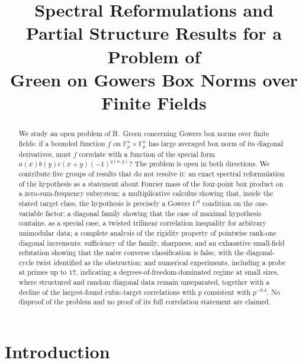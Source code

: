 \documentclass[11pt]{article}
\title{Spectral Reformulations and Partial Structure Results for a Problem of\\ Green on Gowers Box Norms over Finite Fields}
\author{}
\date{}
\theoremstyle{remark}
\begin{document}
\maketitle
\vspace{-2em}

\begin{abstract}
We study an open problem of B.~Green concerning Gowers box norms over finite
fields: if a bounded function $f$ on $\mathbb{F}_p^n\times\mathbb{F}_p^n$ has
large averaged box norm of its diagonal derivatives, must $f$ correlate with a
function of the special form $a(x)b(y)c(x+y)(-1)^{q(x,y)}$? The problem is
open in both directions. We contribute five groups of results that do not
resolve it: an exact spectral reformulation of the hypothesis as a statement
about Fourier mass of the four-point box product on a zero-sum-frequency
subsystem; a multiplicative calculus showing that, inside the stated target
class, the hypothesis is precisely a Gowers $U^3$ condition on the
one-variable factor; a diagonal family showing that the case of maximal
hypothesis contains, as a special case, a twisted trilinear correlation
inequality for arbitrary unimodular data; a complete analysis of the
rigidity property of pointwise rank-one diagonal increments: sufficiency of
the family, sharpness, and an exhaustive small-field refutation showing that
the naive converse classification is false, with the diagonal-cycle twist
identified as the obstruction; and
numerical experiments, including a probe at primes up to $17$, indicating a
degrees-of-freedom-dominated regime at small sizes, where structured and
random diagonal data remain unseparated, together with a decline of the
largest-found cubic-target correlations with $p$ consistent with
$p^{-0.4}$. No
disproof of the problem and no proof of its full correlation statement are
claimed.
\end{abstract}

\section{Introduction}\label{sec:intro}
\end{document}
